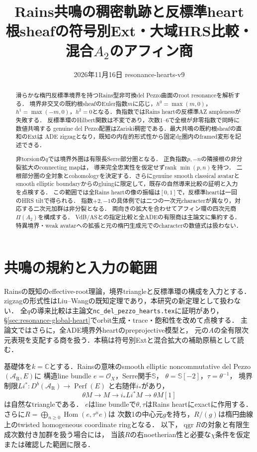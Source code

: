 \documentclass[11pt,a4paper]{ltjsarticle}
\title{Rains共鳴の稠密軌跡と反標準heart\\
\large 根sheafの符号別Ext・大域HRS比較・混合$A_2$のアフィン商}
\author{}
\date{2026年11月16日 \quad resonance-hearts-v9}
\theoremstyle{definition}\newtheorem{remark}[theorem]{注意}
\DeclareMathOperator{\Hom}{Hom}
\DeclareMathOperator{\Perf}{Perf}
\DeclareMathOperator{\qgr}{qgr}
\newcommand{\Db}{D^b}
\begin{document}
\maketitle
\begin{abstract}
滑らかな楕円反標準境界を持つRains型非可換del Pezzo曲面のroot resonanceを解析する．
境界非交叉の既約根sheafのEuler指数$m$に応じ，$h^0=\max(m,0)$，
$h^1=\max(-m,0)$，$h^2=0$となる．負指数ではRains heartの反標準AZ amplenessが失敗する．
反標準環のHilbert関数は不変であり，次数1--6で全根が非零指数で同時に数値共鳴する
genuine del Pezzo配置はZariski稠密である．最大共鳴の既約根sheafの直和のExtは
ADE zigzagとなり，既知の内在的形式性から固定dg圏内のframed変形を記述できる．

非torsionの$q$では境界外圏は有限長Serre部分圏となる．
正負指数$p,-n$の隣接根の非分裂拡大のconnecting mapは，
導来完全忠実性を仮定せずrank $\min(p,n)$を持つ．
二根部分圏の全対象とcohomologyを決定する．さらにgenuine smooth classical avatarと
smooth elliptic boundaryからのgluingに限定して，既存の自然導来比較の証明と入力を点検する．
この範囲では全Rains heartの像の振幅は$[0,1]$で，反標準heartは一回のHRS tiltで得られる．
指数$+2,-1$の具体例では二つの一次元characterが異なり，対応する二次元加群は非分裂となる．
両向きの拡大を合わせてアフィン環の四次元商$\Pi(A_2)$を構成する．
VdB/ASとの指定比較と全ADEの有限商は主論文に集約する．
特異境界・weak avatarへの拡張と元の楕円生成元でのcharacterの数値式は扱わない．
\end{abstract}

\section{共鳴の規約と入力の範囲}
Rainsの既知のeffective-root理論，境界triangleと反標準環の構成を入力とする．
zigzagの形式性はLiu--Wangの既知定理であり，本研究の新定理として扱わない．
全$q$の導来比較は主論文\texttt{nc\_del\_pezzo\_hearts.tex}に証明があり，
\S\ref{sec:resonance-global-heart}でorbit生成・trace・飽和性を改めて点検する．
主論文ではさらに，全ADE境界外heartのpreprojective模型と，
元の$A$の全有限次元表現を支配する商を扱う．本稿は符号別Extと混合拡大の補助原稿として読む．

基礎体を$k=\mathbb C$とする．Rainsの意味のsmooth elliptic
noncommutative del Pezzo $(\mathcal A_{\mathrm R},E)$に
構造line bundle $e=\mathcal O_X$，Serre関手$\mathbb S$，
$\theta=\mathbb S[-2]$，$\tau=\theta^{-1}$，
境界制限$Li^*:\Db(\mathcal A_{\mathrm R})\to\Perf(E)$
と右随伴$i_*$があり，
\begin{equation}\label{eq:boundarytriangle}
 \theta M\longrightarrow M\longrightarrow i_*Li^*M
 \longrightarrow\theta M[1]
\end{equation}
は自然なtriangleである\cite[\S\S4--5]{RainsFiltered}．
$e$はline bundleで$\theta,\tau$はRains heartにexactに作用する．
さらに$R=\bigoplus_{n\ge0}\Hom(e,\tau^ne)$は
次数1の中心元$g$を持ち，$R/(g)$は楕円曲線上のtwisted
homogeneous coordinate ringとなる\cite[Proposition 5.1]{RainsFiltered}．
以下，$\qgr R$の対象と有限生成次数付き加群を扱う場合には，
当該$R$の右noetherian性と必要な$\chi$条件を仮定または確認した範囲に限る．
\end{document}
